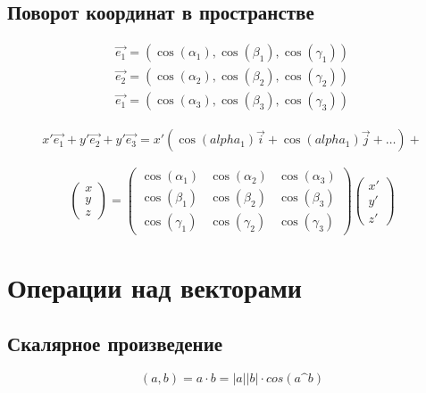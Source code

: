 \documentclass[12pt, a4paper]{article}
\begin{document}
    \subsection{Поворот координат в пространстве}
    
    \begin{gather}
        \vec{e_1} = (\cos(\alpha_1), \cos(\beta_1), \cos(\gamma_1)) \\
        \vec{e_2} = (\cos(\alpha_2), \cos(\beta_2), \cos(\gamma_2)) \\
        \vec{e_1} = (\cos(\alpha_3), \cos(\beta_3), \cos(\gamma_3))
    \end{gather}

    \begin{gather}
        x' \vec{e_1} + y' \vec{e_2} + y' \vec{e_3} = x' (\cos(alpha_1)\vec{i} + \cos(alpha_1)\vec{j} +\ldots) + 
    \end{gather}

    \begin{equation}
        \begin{pmatrix}
            x \\
            y \\
            z
        \end{pmatrix} = \begin{pmatrix}
            \cos(\alpha_1) & \cos(\alpha_2) & \cos(\alpha_3) \\
            \cos(\beta_1) & \cos(\beta_2) & \cos(\beta_3) \\
            \cos(\gamma_1) & \cos(\gamma_2) & \cos(\gamma_3)
        \end{pmatrix} \begin{pmatrix}
            x' \\
            y' \\
            z'
        \end{pmatrix}
    \end{equation}

    \section{Операции над векторами}

    \subsection{Скалярное произведение}
    \begin{definition}
        \begin{equation}
            (a, b) = a \cdot b = |a||b| \cdot cos(a\^b)
        \end{equation}
    \end{definition}
\end{document}
